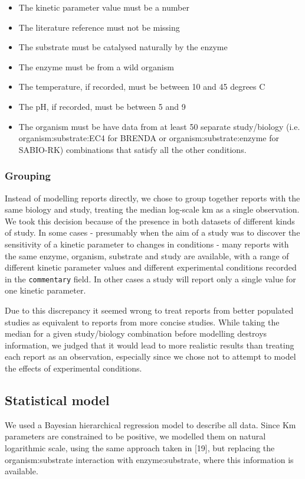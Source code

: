 \documentclass[11pt]{article}
\makeatletter
\newcommand{\citeprocitem}[2]{\hyper@linkstart{cite}{citeproc_bib_item_#1}#2\hyper@linkend}
\makeatother
\begin{document}
\begin{itemize}
\item The kinetic parameter value must be a number
\item The literature reference must not be missing
\item The substrate must be catalysed naturally by the enzyme
\item The enzyme must be from a wild organism
\item The temperature, if recorded, must be between 10 and 45 degrees C
\item The pH, if recorded, must be between 5 and 9
\item The organism must be have data from at least 50 separate study/biology
(i.e. organism:substrate:EC4 for BRENDA or organism:substrate:enzyme for
SABIO-RK) combinations that satisfy all the other conditions.
\end{itemize}

\subsubsection{Grouping}
\label{sec:orgceac13d}
Instead of modelling reports directly, we chose to group together reports with
the same biology and study, treating the median log-scale km as a single
observation. We took this decision because of the presence in both datasets of
different kinds of study. In some cases - presumably when the aim of a study was
to discover the sensitivity of a kinetic parameter to changes in conditions -
many reports with the same enzyme, organism, substrate and study are available,
with a range of different kinetic parameter values and different experimental
conditions recorded in the \texttt{commentary} field. In other cases a study will
report only a single value for one kinetic parameter.

Due to this discrepancy it seemed wrong to treat reports from better populated
studies as equivalent to reports from more concise studies. While taking the
median for a given study/biology combination before modelling destroys
information, we judged that it would lead to more realistic results than
treating each report as an observation, especially since we chose not to
attempt to model the effects of experimental conditions.

\subsection{Statistical model}
\label{sec:org3fdde61}
We used a Bayesian hierarchical regression model to describe all data. Since Km
parameters are constrained to be positive, we modelled them on natural
logarithmic scale, using the same approach taken in
\citeprocitem{19}{[19]}, but replacing the organism:substrate
interaction with enzyme:substrate, where this information is available.
\end{document}
